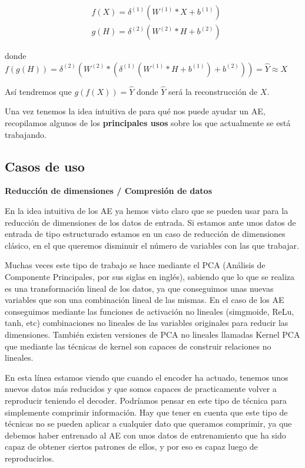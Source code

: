 \documentclass[
  a4paper,
  DIV=11,
  numbers=noendperiod]{scrreprt}
\begin{document}
\[
\begin{aligned}
& f(X)=\delta^{(1)}\left(W^{(1)} * X+b^{(1)}\right) \\
& g(H)=\delta^{(2)}\left(W^{(2)} * H+b^{(2)}\right)
\end{aligned}
\]

donde
\(f(g(H))=\delta^{(2)}\left(W^{(2)} *\left(\delta^{(1)}\left(W^{(1)} * H+b^{(1)}\right)+b^{(2)}\right)\right)=\hat{Y} \approx X\)

Así tendremos que \(g(f(X))=\hat{Y}\) donde \(\hat{Y}\) será la
reconstrucción de \(X\).

Una vez tenemos la idea intuitiva de para qué nos puede ayudar un AE,
recopilamos algunos de los \textbf{principales usos} sobre los que
actualmente se está trabajando.

\subsection{Casos de uso}\label{casos-de-uso}

\textbf{Reducción de dimensiones / Compresión de datos}

En la idea intuitiva de los AE ya hemos visto claro que se pueden usar
para la reducción de dimensiones de los datos de entrada. Si estamos
ante unos datos de entrada de tipo estructurado estamos en un caso de
reducción de dimensiones clásico, en el que queremos disminuir el número
de variables con las que trabajar.

Muchas veces este tipo de trabajo se hace mediante el PCA (Análisis de
Componente Principales, por sus siglas en inglés), sabiendo que lo que
se realiza es una transformación lineal de los datos, ya que conseguimos
unas nuevas variables que son una combinación lineal de las mismas. En
el caso de los AE conseguimos mediante las funciones de activación no
lineales (simgmoide, ReLu, tanh, etc) combinaciones no lineales de las
variables originales para reducir las dimensiones. También existen
versiones de PCA no lineales llamadas Kernel PCA que mediante las
técnicas de kernel son capaces de construir relaciones no lineales.

En esta línea estamos viendo que cuando el encoder ha actuado, tenemos
unos nuevos datos más reducidos y que somos capaces de practicamente
volver a reproducir teniendo el decoder. Podríamos pensar en este tipo
de técnica para simplemente comprimir información. Hay que tener en
cuenta que este tipo de técnicas no se pueden aplicar a cualquier dato
que queramos comprimir, ya que debemos haber entrenado al AE con unos
datos de entrenamiento que ha sido capaz de obtener ciertos patrones de
ellos, y por eso es capaz luego de reproducirlos.
\end{document}
